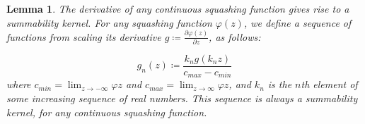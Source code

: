 \documentclass{article} %
\newtheorem{lem}[thm]{Lemma}
\begin{document}
\begin{lem}\label{lem:squashderivissum}
	The derivative of any continuous squashing function gives rise to a summability kernel.
	For any squashing function $\varphi(z)$,
	we define a sequence of functions from scaling its derivative 
    $g \coloneqq \frac{\partial\varphi(z)}{\partial z}$, as follows:
    
    
	\begin{equation}
	g_n(z) \coloneqq \frac{k_n g(k_n z)}{ c_{max} - c_{min}} 
	\end{equation}
	 where $c_{min}=\lim_{z \to -\infty} \varphi{z}$ and $c_{max}=\lim_{z \to \infty} \varphi{z}$,
	 and $k_n$ is the $n$th element of some increasing sequence of real numbers.
	This sequence is always a summability kernel, for any continuous squashing function.
	

\end{lem}
\end{document}
